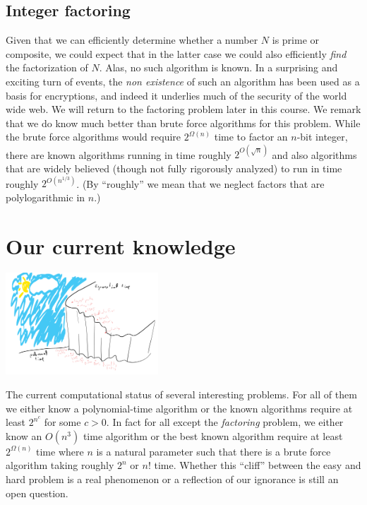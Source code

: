 \subsection{Integer factoring}\label{Integer-factoring}

Given that we can efficiently determine whether a number \(N\) is prime
or composite, we could expect that in the latter case we could also
efficiently \emph{find} the factorization of \(N\). Alas, no such
algorithm is known. In a surprising and exciting turn of events, the
\emph{non existence} of such an algorithm has been used as a basis for
encryptions, and indeed it underlies much of the security of the world
wide web. We will return to the factoring problem later in this course.
We remark that we do know much better than brute force algorithms for
this problem. While the brute force algorithms would require
\(2^{\Omega(n)}\) time to factor an \(n\)-bit integer, there are known
algorithms running in time roughly \(2^{O(\sqrt{n})}\) and also
algorithms that are widely believed (though not fully rigorously
analyzed) to run in time roughly \(2^{O(n^{1/3})}\). (By ``roughly'' we
mean that we neglect factors that are polylogarithmic in \(n\).)

\section{Our current knowledge}\label{Our-current-knowledge}


\begin{marginfigure}
\centering
\includegraphics[width=\linewidth, height=1.5in, keepaspectratio]{../figure/poly_vs_exp.png}
\caption{The current computational status of several interesting
problems. For all of them we either know a polynomial-time algorithm or
the known algorithms require at least \(2^{n^c}\) for some \(c>0\). In
fact for all except the \emph{factoring} problem, we either know an
\(O(n^3)\) time algorithm or the best known algorithm require at least
\(2^{\Omega(n)}\) time where \(n\) is a natural parameter such that
there is a brute force algorithm taking roughly \(2^n\) or \(n!\) time.
Whether this ``cliff'' between the easy and hard problem is a real
phenomenon or a reflection of our ignorance is still an open question.}
\label{current_status}
\end{marginfigure}

